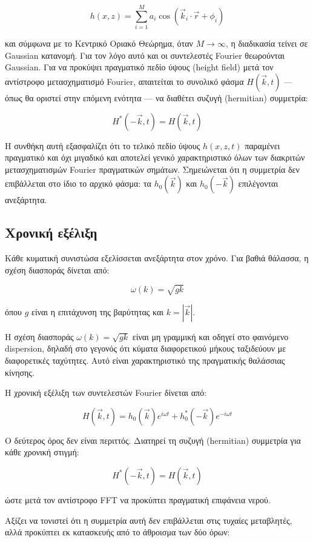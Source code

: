 \documentclass[a4paper, 11pt]{article}
\begin{document}
\[
h(x,z)
=
\sum_{i=1}^{M}
a_i
\cos(\vec{k}_i\cdot\vec{r}+\phi_i)
\]

και σύμφωνα με το Κεντρικό Οριακό Θεώρημα, όταν \(M \to \infty\), η
διαδικασία τείνει σε Gaussian κατανομή. Για τον λόγο αυτό και οι
συντελεστές Fourier θεωρούνται Gaussian. Για να προκύψει πραγματικό
πεδίο ύψους (height field) μετά τον αντίστροφο μετασχηματισμό Fourier,
απαιτείται το συνολικό φάσμα \(H(\vec{k},t)\) --- όπως θα οριστεί στην
επόμενη ενότητα --- να διαθέτει συζυγή (hermitian) συμμετρία:

\[
H^*(-\vec{k},t) = H(\vec{k},t)
\]

Η συνθήκη αυτή εξασφαλίζει ότι το τελικό πεδίο ύψους \(h(x,z,t)\)
παραμένει πραγματικό και όχι μιγαδικό και αποτελεί γενικό χαρακτηριστικό
όλων των διακριτών μετασχηματισμών Fourier πραγματικών σημάτων.
Σημειώνεται ότι η συμμετρία δεν επιβάλλεται στο ίδιο το αρχικό φάσμα: τα
\(h_0(\vec{k})\) και \(h_0(-\vec{k})\) επιλέγονται ανεξάρτητα.

\subsection{Χρονική
εξέλιξη}\label{ux3c7ux3c1ux3bfux3bdux3b9ux3baux3ae-ux3b5ux3beux3adux3bbux3b9ux3beux3b7}

Κάθε κυματική συνιστώσα εξελίσσεται ανεξάρτητα στον χρόνο. Για βαθιά
θάλασσα, η σχέση διασποράς δίνεται από:

\[
\omega(k)=\sqrt{gk}
\]

όπου \(g\) είναι η επιτάχυνση της βαρύτητας και \(k = |\vec{k}|\).

Η σχέση διασποράς \(\omega(k) = \sqrt{gk}\) είναι μη γραμμική και οδηγεί
στο φαινόμενο dispersion, δηλαδή στο γεγονός ότι κύματα διαφορετικού
μήκους ταξιδεύουν με διαφορετικές ταχύτητες. Αυτό είναι χαρακτηριστικό
της πραγματικής θαλάσσιας κίνησης.

Η χρονική εξέλιξη των συντελεστών Fourier δίνεται από:

\[
H(\vec{k},t)
=
h_0(\vec{k})e^{i\omega t}
+
h_0^*(-\vec{k})e^{-i\omega t}
\]

Ο δεύτερος όρος δεν είναι περιττός. Διατηρεί τη συζυγή (hermitian)
συμμετρία για κάθε χρονική στιγμή:

\[
H^*(-\vec{k},t)=H(\vec{k},t)
\]

ώστε μετά τον αντίστροφο FFT να προκύπτει πραγματική επιφάνεια νερού.

Αξίζει να τονιστεί ότι η συμμετρία αυτή δεν επιβάλλεται στις τυχαίες
μεταβλητές, αλλά προκύπτει εκ κατασκευής από το άθροισμα των δύο όρων:
\end{document}
